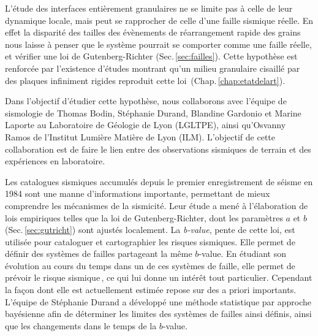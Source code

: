 L'étude des interfaces entièrement granulaires ne se limite pas à celle de leur dynamique locale, mais peut se rapprocher de celle d'une faille sismique réelle. En effet la disparité des tailles des évènements de réarrangement rapide des grains nous laisse à penser que le système pourrait se comporter comme une faille réelle, et vérifier une loi de Gutenberg-Richter (Sec.\,\ref{sec:failles}). Cette hypothèse est renforcée par l'existence d'études montrant qu'un milieu granulaire cisaillé par des plaques infiniment rigides reproduit cette loi\,\cite{lherminier_continuously_2019, geller_stick-slip_2015, ramos_avalanche_2009, houdoux_micro-slips_2021} (Chap.\,\ref{chap:etatdelart}).

Dans l'objectif d'étudier cette hypothèse, nous collaborons avec l'équipe de sismologie de Thomas Bodin, Stéphanie Durand, Blandine Gardonio et Marine Laporte au Laboratoire de Géologie de Lyon (LGLTPE), ainsi qu'Osvanny Ramos de l’Institut Lumière Matière de Lyon (ILM). L'objectif de cette collaboration est de faire le lien entre des observations sismiques de terrain et des expériences en laboratoire.

Les catalogues sismiques accumulés depuis le premier enregistrement de séisme en 1984 sont une manne d'informations importante, permettant de mieux comprendre les mécanismes de la sismicité. Leur étude a mené à l'élaboration de lois empiriques telles que la loi de Gutenberg-Richter, dont les paramètres $a$ et $b$ (Sec.\,\ref{sec:gutricht}) sont ajustés localement. La \textit{b-value}, pente de cette loi, est utilisée pour cataloguer et cartographier les risques sismiques. Elle permet de définir des systèmes de failles partageant la même $b$-value. En étudiant son évolution au cours du temps dans un de ces systèmes de faille, elle permet de prévoir le risque sismique\,\cite{smith_b-value_1981,lan_b-value_1988}, ce qui lui donne un intérêt tout particulier. Cependant la façon dont elle est actuellement estimée repose sur des a priori importants. L'équipe de Stéphanie Durand a développé une méthode statistique par approche bayésienne afin de déterminer les limites des systèmes de failles ainsi définis, ainsi que les changements dans le temps de la $b$-value.

